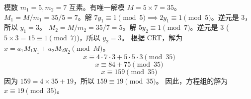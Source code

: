\begin{enumerate}
\begin{solution}
$$        $$
        模数 $m_1=5, m_2=7$ 互素。有唯一解模 $M = 5 \times 7 = 35$。
        $M_1 = M/m_1 = 35/5 = 7$。解 $7y_1 \equiv 1 \pmod 5 \implies 2y_1 \equiv 1 \pmod 5$。逆元是 3，所以 $y_1=3$。
        $M_2 = M/m_2 = 35/7 = 5$。解 $5y_2 \equiv 1 \pmod 7$。逆元是 3 ($5 \times 3 = 15 \equiv 1 \pmod 7$)，所以 $y_2=3$。
        根据 CRT，解为 $x = a_1 M_1 y_1 + a_2 M_2 y_2 \pmod M$。
        \[ x \equiv 4 \cdot 7 \cdot 3 + 5 \cdot 5 \cdot 3 \pmod{35} \]
        \[ x \equiv 84 + 75 \pmod{35} \]
        \[ x \equiv 159 \pmod{35} \]
        因为 $159 = 4 \times 35 + 19$，所以 $159 \equiv 19 \pmod{35}$。
        因此，方程组的解为 $x \equiv 19 \pmod{35}$。
    \end{solution}
\end{enumerate}